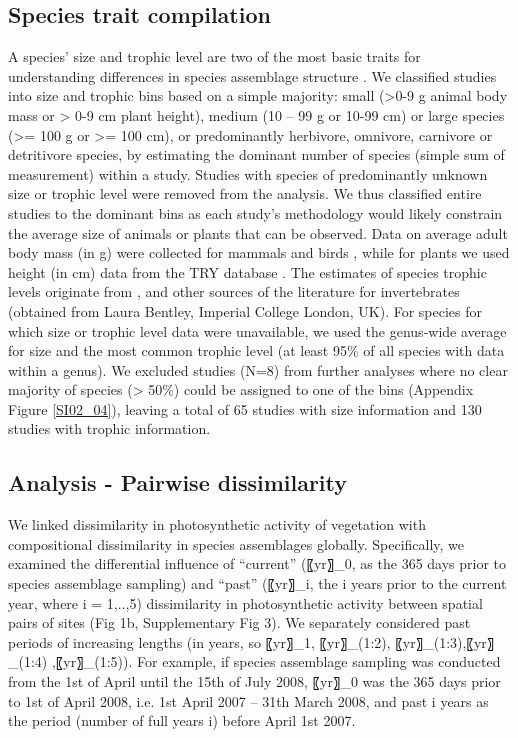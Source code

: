 
\subsection{Species trait compilation}
A species’ size and trophic level are two of the most basic traits for understanding differences in species assemblage structure \citep{Speakman2005,Terborgh2015}. We classified studies into size and trophic bins based on a simple majority: small (>0-9 g animal body mass or > 0-9 cm plant height), medium (10 – 99 g or 10-99 cm) or large species (>= 100 g or >= 100 cm), or predominantly herbivore, omnivore, carnivore or detritivore species, by estimating the dominant number of species (simple sum of measurement) within a study. Studies with species of predominantly unknown size or trophic level were removed from the analysis. We thus classified entire studies to the dominant bins as each study’s methodology would likely constrain the average size of animals or plants that can be observed. Data on average adult body mass (in g) were collected for mammals \citep{Jones2009} and birds \citep{Myhrvold2015}, while for plants we used height (in cm) data from the TRY database \citep{Kattge2011}. The estimates of species trophic levels originate from \cite{Kissling2014}, \cite{Wilman2014} and other sources of the literature for invertebrates (obtained from Laura Bentley, Imperial College London, UK). For species for which size or trophic level data were unavailable, we used the genus-wide average for size and the most common trophic level (at least 95\% of all species with data within a genus). We excluded studies (N=8) from further analyses where no clear majority of species (> 50\%) could be assigned to one of the bins (Appendix Figure \ref{SI02_04}), leaving a total of 65 studies with size information and 130 studies with trophic information. 

\subsection{Analysis - Pairwise dissimilarity}
We linked dissimilarity in photosynthetic activity of vegetation with compositional dissimilarity in species assemblages globally. Specifically, we examined the differential influence of “current” (〖yr〗_0, as the 365 days prior to species assemblage sampling) and “past” (〖yr〗_i, the i years prior to the current year, where i = 1,..,5) dissimilarity in photosynthetic activity between spatial pairs of sites (Fig 1b, Supplementary Fig 3). We separately considered past periods of increasing lengths (in years, so 〖yr〗_1, 〖yr〗_(1:2), 〖yr〗_(1:3),〖yr〗_(1:4)  ,〖yr〗_(1:5)). For example, if species assemblage sampling was conducted from the 1st of April until the 15th of July 2008, 〖yr〗_0 was the 365 days prior to 1st of April 2008, i.e. 1st April 2007 – 31th March 2008, and past i years as the period (number of full years i) before April 1st 2007.


